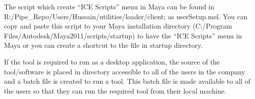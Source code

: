 The script which create “ICE Scripts” menu in Maya can be found in
R:/Pipe\_Repo/Users/Hussain/utilities/loader/client; as userSetup.mel. You can
copy and paste this script to your Maya installation directory (C:/Program
Files/Autodesk/Maya2011/scripts/startup) to have the “ICE Scripts” menu in
Maya or you can create a shortcut to the file in startup directory.

If the tool is required to run as a desktop application, the source of the
tool/software is placed in directory accessible to all of the users in the
company and a batch file is created to run a tool. This batch file is made
available to all of the users so that they can run the required tool from
their local machine. 


